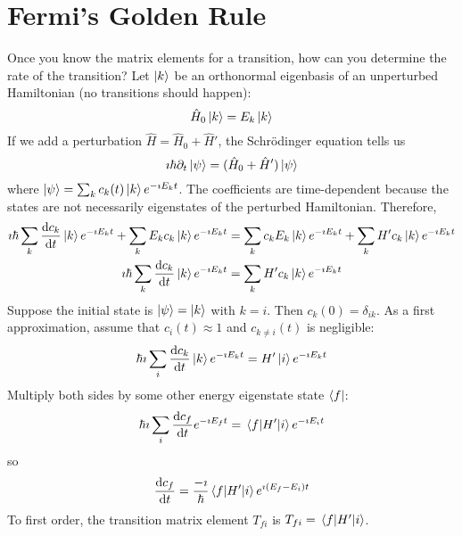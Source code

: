 \documentclass[a4paper,twoside,master.tex]{subfiles}
\begin{document}

\section{Fermi's Golden Rule}
\label{sec:fermi's_golden_rule}

Once you know the matrix elements for a transition, how can you determine the rate of the transition? Let $\ket{k} $ be an orthonormal eigenbasis of an unperturbed Hamiltonian (no transitions should happen):
\begin{equation}
    \hat{H}_0\ket{k} = E_k\ket{k}
\end{equation}
If we add a perturbation $ \hat{H} = \hat{H}_0 + \hat{H}' $, the Schr\"odinger equation tells us
\begin{equation}
    \imath \hbar \partial_t\ket{\psi} = (\hat{H}_0 + \hat{H}')\ket{\psi}
\end{equation}
where $\ket{\psi} = \sum_k c_k(t) \ket{k} e^{- \imath E_k t} $. The coefficients are time-dependent because the states are not necessarily eigenstates of the perturbed Hamiltonian. Therefore,
\begin{align}
    \imath \hbar \sum_k \dv{c_k}{t}\ket{k} e^{- \imath E_k t} + \sum_k E_k c_k\ket{k} e^{- \imath E_k t} &= \sum_k c_k E_k\ket{k} e^{- \imath E_k t} + \sum_k H' c_k\ket{k} e^{- \imath E_k t} \\
    \imath \hbar \sum_k \dv{c_k}{t}\ket{k} e^{- \imath E_k t} &= \sum_k H' c_k\ket{k} e^{- \imath E_k t} 
\end{align}
Suppose the initial state is $\ket{\psi} =\ket{k} $ with $ k = i $. Then $ c_k(0) = \delta_{ik} $. As a first approximation, assume that $ c_i(t) \approx 1 $ and $ c_{k \neq i}(t) $ is negligible:
\begin{equation}
    \hbar \imath \sum_i \dv{c_k}{t}\ket{k} e^{- \imath E_k t} = H'\ket{i} e^{- \imath E_k t}
\end{equation}
Multiply both sides by some other energy eigenstate state $\bra{f} $:
\begin{equation}
    \hbar \imath \sum_i \dv{c_f}{t} e^{- \imath E_f t} = \mel{f}{H'}{i} e^{- \imath E_i t}
\end{equation}
so
\begin{equation}
    \dv{c_f}{t} = \frac{- \imath}{\hbar} \mel{f}{H'}{i} e^{\imath (E_f - E_i) t}
\end{equation}
To first order, the transition matrix element $ T_{f i} $ is $ T_{f i} = \mel{f}{H'}{i} $.
\end{document}
